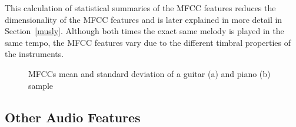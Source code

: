 This calculation of statistical summaries of the MFCC features reduces the dimensionality of the MFCC features and is later explained in more detail in Section~\ref{musly}. 
Although both times the exact same melody is played in the same tempo, the MFCC features vary due to the different timbral properties of the instruments. 
\begin{figure}[htbp]
	\centering
	\caption{MFCCs mean and standard deviation of a guitar (a) and piano (b) sample}	
	\label{fig:timbrstatmfcce}
\end{figure}
\FloatBarrier

\subsection{Other Audio Features}\label{otheraudiofeat}

